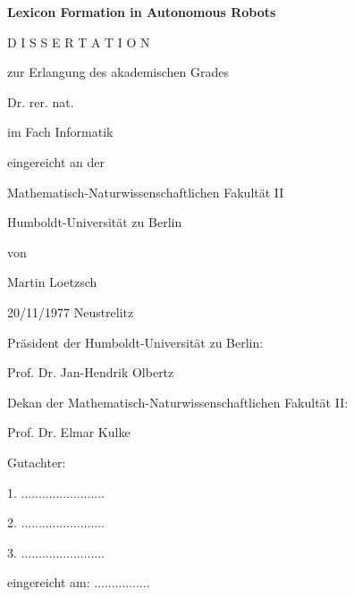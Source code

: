 

\centerline{\bfseries\sffamily\huge Lexicon Formation in Autonomous Robots}

\vspace{2cm}

\large 
\centerline{D I S S E R T A T I O N}

\vspace{0.3cm}

\centerline{zur Erlangung des akademischen Grades}

\vspace{0.3cm}

\centerline{Dr. rer. nat.}
\centerline{im Fach Informatik}

\vspace{1cm}

\centerline{eingereicht an der}

\vspace{0.3cm}

\centerline{Mathematisch-Naturwissenschaftlichen Fakultät II}
\centerline{Humboldt-Universität zu Berlin}

\vspace{1cm}

\centerline{von}
\centerline{\sffamily Martin Loetzsch}
\centerline{20/11/1977 Neustrelitz}


\vspace{1.5cm}

Präsident der Humboldt-Universität zu Berlin:

Prof. Dr. Jan-Hendrik Olbertz

\vspace{0.5cm}

Dekan der Mathematisch-Naturwissenschaftlichen Fakultät II:

Prof. Dr. Elmar Kulke

\vspace{0.5cm}


Gutachter:

1. ........................

2. ........................

3. ........................

\vspace{0.5cm}

eingereicht am: ................

\normalsize

\cleardoublepage

